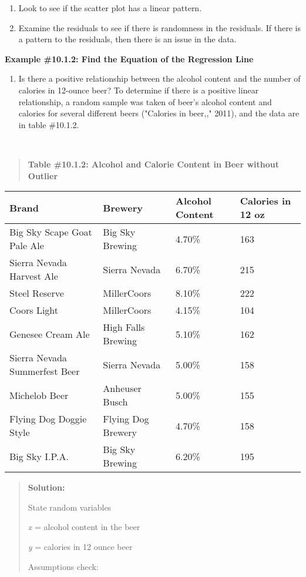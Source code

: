 \documentclass[]{book}
\providecommand{\tightlist}{%
  \setlength{\itemsep}{0pt}\setlength{\parskip}{0pt}}
\begin{document}
\begin{enumerate}
\def\labelenumi{\roman{enumi}.}
\item
  Look to see if the scatter plot has a linear pattern.
\item
  Examine the residuals to see if there is randomness in the residuals. If there is a pattern to the residuals, then there is an issue in the data.
\end{enumerate}

\textbf{Example \#10.1.2: Find the Equation of the Regression Line}

\begin{enumerate}
\def\labelenumi{\alph{enumi}.}
\tightlist
\item
  Is there a positive relationship between the alcohol content and the number of calories in 12-ounce beer? To determine if there is a positive linear relationship, a random sample was taken of beer's alcohol content and calories for several different beers ("Calories in beer,," 2011), and the data are in table \#10.1.2.
\end{enumerate}

\textbf{\\
}

\begin{quote}
\textbf{Table \#10.1.2: Alcohol and Calorie Content in Beer without
Outlier}
\end{quote}

\begin{longtable}[]{@{}llll@{}}
\toprule
Brand & Brewery & Alcohol Content & Calories in 12 oz\tabularnewline
\midrule
\endhead
Big Sky Scape Goat Pale Ale & Big Sky Brewing & 4.70\% & 163\tabularnewline
Sierra Nevada Harvest Ale & Sierra Nevada & 6.70\% & 215\tabularnewline
Steel Reserve & MillerCoors & 8.10\% & 222\tabularnewline
Coors Light & MillerCoors & 4.15\% & 104\tabularnewline
Genesee Cream Ale & High Falls Brewing & 5.10\% & 162\tabularnewline
Sierra Nevada Summerfest Beer & Sierra Nevada & 5.00\% & 158\tabularnewline
Michelob Beer & Anheuser Busch & 5.00\% & 155\tabularnewline
Flying Dog Doggie Style & Flying Dog Brewery & 4.70\% & 158\tabularnewline
Big Sky I.P.A. & Big Sky Brewing & 6.20\% & 195\tabularnewline
\bottomrule
\end{longtable}

\begin{quote}
\textbf{Solution:}

State random variables

\emph{x} = alcohol content in the beer

\emph{y} = calories in 12 ounce beer

Assumptions check:
\end{quote}
\end{document}
